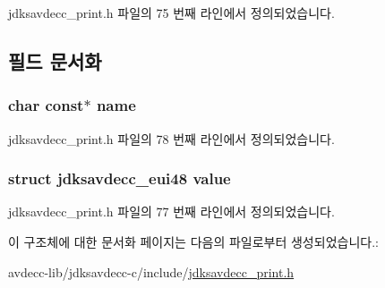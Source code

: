 jdksavdecc\+\_\+print.\+h 파일의 75 번째 라인에서 정의되었습니다.



\subsection{필드 문서화}
\subsubsection[{\texorpdfstring{name}{name}}]{\setlength{\rightskip}{0pt plus 5cm}char const$\ast$ name}\hypertarget{structjdksavdecc__eui48__name_a5f1de76dd5d451949e12c0fbc966ca70}{}\label{structjdksavdecc__eui48__name_a5f1de76dd5d451949e12c0fbc966ca70}


jdksavdecc\+\_\+print.\+h 파일의 78 번째 라인에서 정의되었습니다.

\subsubsection[{\texorpdfstring{value}{value}}]{\setlength{\rightskip}{0pt plus 5cm}struct {\bf jdksavdecc\+\_\+eui48} value}\hypertarget{structjdksavdecc__eui48__name_a71faefd0701337de76f7672991d987c0}{}\label{structjdksavdecc__eui48__name_a71faefd0701337de76f7672991d987c0}


jdksavdecc\+\_\+print.\+h 파일의 77 번째 라인에서 정의되었습니다.



이 구조체에 대한 문서화 페이지는 다음의 파일로부터 생성되었습니다.\+:\begin{DoxyCompactItemize}
\item 
avdecc-\/lib/jdksavdecc-\/c/include/\hyperlink{jdksavdecc__print_8h}{jdksavdecc\+\_\+print.\+h}\end{DoxyCompactItemize}
